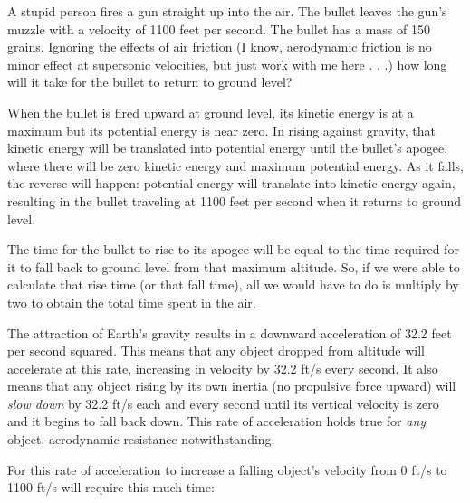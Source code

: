 

A stupid person fires a gun straight up into the air.  The bullet leaves the gun's muzzle with a velocity of 1100 feet per second.  The bullet has a mass of 150 grains.  Ignoring the effects of air friction (I know, aerodynamic friction is no minor effect at supersonic velocities, but just work with me here . . .) how long will it take for the bullet to return to ground level?







When the bullet is fired upward at ground level, its kinetic energy is at a maximum but its potential energy is near zero.  In rising against gravity, that kinetic energy will be translated into potential energy until the bullet's apogee, where there will be zero kinetic energy and maximum potential energy.  As it falls, the reverse will happen: potential energy will translate into kinetic energy again, resulting in the bullet traveling at 1100 feet per second when it returns to ground level.

\vskip 10pt

The time for the bullet to rise to its apogee will be equal to the time required for it to fall back to ground level from that maximum altitude.  So, if we were able to calculate that rise time (or that fall time), all we would have to do is multiply by two to obtain the total time spent in the air.

\vskip 10pt

The attraction of Earth's gravity results in a downward acceleration of 32.2 feet per second squared.  This means that any object dropped from altitude will accelerate at this rate, increasing in velocity by 32.2 ft/s every second.  It also means that any object rising by its own inertia (no propulsive force upward) will {\it slow down} by 32.2 ft/s each and every second until its vertical velocity is zero and it begins to fall back down.  This rate of acceleration holds true for {\it any} object, aerodynamic resistance notwithstanding.

\vskip 10pt

For this rate of acceleration to increase a falling object's velocity from 0 ft/s to 1100 ft/s will require this much time:

